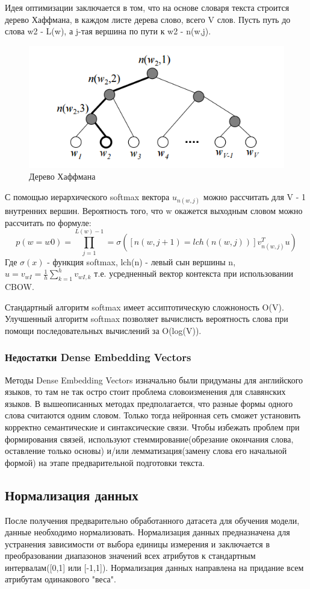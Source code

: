 Идея оптимизации заключается в том, что на основе словаря текста строится дерево Хаффмана, в каждом листе дерева слово, всего V слов. Пусть путь до слова w2 - L(w), а j-тая вершина по пути к w2 - n(w,j).
\begin{figure}[!h]
	\centering
	\includegraphics[width=.5\textwidth]{master_img/haffman.png}
	\caption{Дерево Хаффмана}
	\label{fig04_master}
\end{figure}
С помощью иерархического softmax вектора $u_{n(w,j)}$ можно рассчитать для V - 1 внутренних вершин.
Вероятность того, что w окажется выходным словом можно рассчитать по формуле:
\begin{equation}
p(w = w0) = \prod_{j=1}^{L(w) - 1} = \sigma([n(w,j + 1) = lch(n(w,j))]v^T_{n(w,j)}u)
\end{equation}
Где $\sigma(x)$ - функция softmax, lch(n) - левый сын вершины n, $u=v_{wI}=\frac{1}{h}\sum^h_{k=1}v_{wI,k}$ т.е. усредненный вектор контекста при использовании CBOW.

Стандартный алгоритм softmax имеет ассиптотическую сложноность O(V). Улучшенный алгоритм softmax позволяет вычислисть вероятность слова при помощи последовательных вычислений за O(log(V)).

\subsubsection{Недостатки Dense Embedding Vectors}
Методы Dense Embedding Vectors изначально были придуманы для английского языков, то там не так остро стоит проблема словоизменения для славянских языков.  В вышеописанных методах предполагается, что разные формы одного слова считаются одним словом. Только тогда нейронная сеть сможет установить корректно семантические и синтаксические связи. Чтобы избежать проблем при формирования связей, используют стеммирование(обрезание окончания слова, оставление только основы) и/или лемматизация(замену слова его начальной формой) 
 на этапе предварительной подготовки текста.
 
\subsection{Нормализация данных} 
После получения предварительно обработанного датасета для обучения модели, данные необходимо нормализовать. Нормализация данных предназначена для устранения зависимости от выбора единицы измерения и заключается в преобразовании диапазонов значений всех атрибутов к стандартным интервалам([0,1] или [-1,1])\cite{Book25}. Нормализация данных направлена на придание всем атрибутам одинакового "веса".

